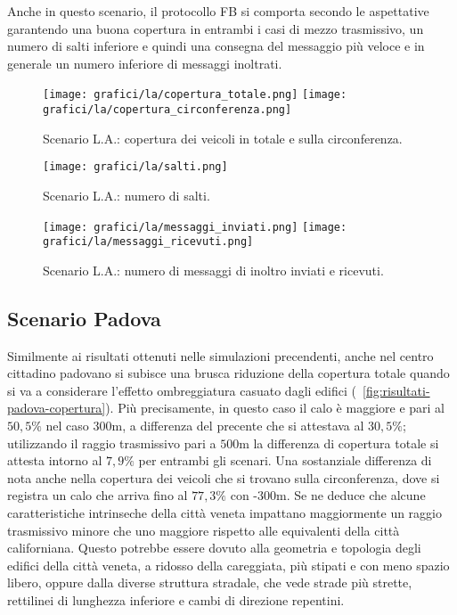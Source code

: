 Anche in questo scenario, il protocollo FB si comporta secondo le aspettative
garantendo una buona copertura in entrambi i casi di mezzo trasmissivo,
un numero di salti inferiore e quindi una consegna del messaggio più veloce
e in generale un numero inferiore di messaggi inoltrati.
%
\begin{figure}[htbp]
	\centering
		\texttt{[image: grafici/la/copertura\_totale.png]}
		\texttt{[image: grafici/la/copertura\_circonferenza.png]}
\caption{Scenario L.A.: copertura dei veicoli in totale e sulla circonferenza.\label{fig:risultati-la-copertura}}
\end{figure}
%
\begin{figure}[htbp]
	\centering
		\texttt{[image: grafici/la/salti.png]}
\caption{Scenario L.A.: numero di salti.\label{fig:risultati-la-salti}}
\end{figure}
%
\begin{figure}[htbp]
	\centering
		\texttt{[image: grafici/la/messaggi\_inviati.png]}
		\texttt{[image: grafici/la/messaggi\_ricevuti.png]}
\caption{Scenario L.A.: numero di messaggi di inoltro inviati e ricevuti.\label{fig:risultati-la-messaggi}}
\end{figure}
\clearpage
%
%
\subsection{Scenario Padova}\label{subsec:risultati-pd}
Similmente ai risultati ottenuti nelle simulazioni precendenti,
anche nel centro cittadino padovano si subisce una brusca riduzione della copertura totale
quando si va a considerare l'effetto ombreggiatura casuato dagli edifici (\figurename~\ref{fig:risultati-padova-copertura}).
Più precisamente, in questo caso il calo è maggiore e pari al $50,5\%$ nel caso $300$m,
a differenza del precente che si attestava al $30,5\%$;
utilizzando il raggio trasmissivo pari a $500$m la differenza di copertura totale si attesta
intorno al $7,9\%$ per entrambi gli scenari.
Una sostanziale differenza di nota anche nella copertura dei veicoli che si trovano sulla circonferenza,
dove si registra un calo che arriva fino al $77,3\%$ con \statica{}-$300$m.
Se ne deduce che alcune caratteristiche intrinseche della città veneta
impattano maggiormente un raggio trasmissivo minore che uno maggiore rispetto
alle equivalenti della città californiana. %
Questo potrebbe essere dovuto alla geometria e topologia degli edifici della città
veneta, a ridosso della careggiata, più stipati e con meno spazio libero,
oppure dalla diverse struttura stradale, che vede strade più strette,
rettilinei di lunghezza inferiore e cambi di direzione repentini.

